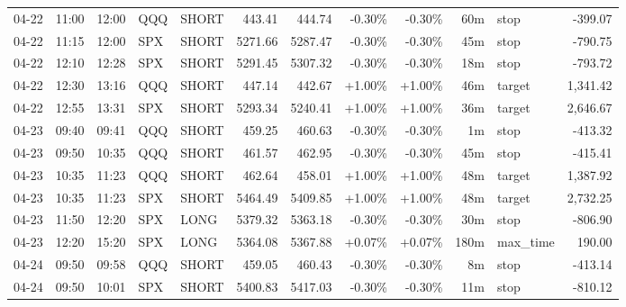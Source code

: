 \documentclass[11pt,a4paper,twoside]{article}
\begin{document}
\begin{center}
\begin{longtable}{>{\color{txtmain}}l l l l l r r r r r >{\color{txtmain}}l r}
04-22 & 11:00 & 12:00 & QQQ & SHORT & 443.41 & 444.74 & \textcolor{lossred}{-0.30\%} & \textcolor{lossred}{-0.30\%} & 60m & stop & \textcolor{lossred}{-399.07} \\
04-22 & 11:15 & 12:00 & SPX & SHORT & 5271.66 & 5287.47 & \textcolor{lossred}{-0.30\%} & \textcolor{lossred}{-0.30\%} & 45m & stop & \textcolor{lossred}{-790.75} \\
04-22 & 12:10 & 12:28 & SPX & SHORT & 5291.45 & 5307.32 & \textcolor{lossred}{-0.30\%} & \textcolor{lossred}{-0.30\%} & 18m & stop & \textcolor{lossred}{-793.72} \\
04-22 & 12:30 & 13:16 & QQQ & SHORT & 447.14 & 442.67 & \textcolor{wingreen}{+1.00\%} & \textcolor{wingreen}{+1.00\%} & 46m & target & \textcolor{wingreen}{1,341.42} \\
04-22 & 12:55 & 13:31 & SPX & SHORT & 5293.34 & 5240.41 & \textcolor{wingreen}{+1.00\%} & \textcolor{wingreen}{+1.00\%} & 36m & target & \textcolor{wingreen}{2,646.67} \\
04-23 & 09:40 & 09:41 & QQQ & SHORT & 459.25 & 460.63 & \textcolor{lossred}{-0.30\%} & \textcolor{lossred}{-0.30\%} & 1m & stop & \textcolor{lossred}{-413.32} \\
04-23 & 09:50 & 10:35 & QQQ & SHORT & 461.57 & 462.95 & \textcolor{lossred}{-0.30\%} & \textcolor{lossred}{-0.30\%} & 45m & stop & \textcolor{lossred}{-415.41} \\
04-23 & 10:35 & 11:23 & QQQ & SHORT & 462.64 & 458.01 & \textcolor{wingreen}{+1.00\%} & \textcolor{wingreen}{+1.00\%} & 48m & target & \textcolor{wingreen}{1,387.92} \\
04-23 & 10:35 & 11:23 & SPX & SHORT & 5464.49 & 5409.85 & \textcolor{wingreen}{+1.00\%} & \textcolor{wingreen}{+1.00\%} & 48m & target & \textcolor{wingreen}{2,732.25} \\
04-23 & 11:50 & 12:20 & SPX & LONG & 5379.32 & 5363.18 & \textcolor{lossred}{-0.30\%} & \textcolor{lossred}{-0.30\%} & 30m & stop & \textcolor{lossred}{-806.90} \\
04-23 & 12:20 & 15:20 & SPX & LONG & 5364.08 & 5367.88 & \textcolor{wingreen}{+0.07\%} & \textcolor{wingreen}{+0.07\%} & 180m & max\_time & \textcolor{wingreen}{190.00} \\
04-24 & 09:50 & 09:58 & QQQ & SHORT & 459.05 & 460.43 & \textcolor{lossred}{-0.30\%} & \textcolor{lossred}{-0.30\%} & 8m & stop & \textcolor{lossred}{-413.14} \\
04-24 & 09:50 & 10:01 & SPX & SHORT & 5400.83 & 5417.03 & \textcolor{lossred}{-0.30\%} & \textcolor{lossred}{-0.30\%} & 11m & stop & \textcolor{lossred}{-810.12} \\

\end{longtable}
\end{center}
\end{document}
